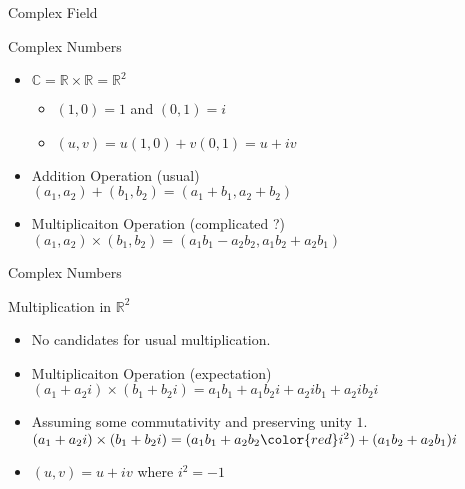 \documentclass{beamer}
\begin{document}
\begin{frame}{Complex Field}
\begin{block}{Complex Numbers}
\begin{itemize}
	\item $\mathbb{C} = \mathbb{R} \times \mathbb{R} = \mathbb{R}^2$
	\begin{itemize}
		\item $(1,0) = 1$ and $(0,1) = i$
		\item $(u,v) = u(1,0)+v(0,1) = u+iv$
	\end{itemize}
	\item Addition Operation (usual)\\
		$(a_1,a_2) + (b_1,b_2) = (a_1+b_1,a_2+b_2)$
	\item Multiplicaiton Operation (complicated ?)\\
		$(a_1,a_2) \times (b_1,b_2) = (a_1b_1-a_2b_2,a_1b_2+a_2b_1)$
\end{itemize}
\end{block}
\end{frame}
\begin{frame}{Complex Numbers}
\begin{block}{Multiplication in $\mathbb{R}^2$}
\begin{itemize}
	\item No candidates for usual multiplication.
	\item Multiplicaiton Operation (expectation)\\
		$(a_1+a_2i) \times (b_1+b_2i) = a_1b_1+a_1b_2i+a_2ib_1+a_2ib_2i$
	\item Assuming some commutativity and preserving unity $1$. \\
		$(a_1+a_2i) \times (b_1+b_2i) = (a_1b_1+a_2b_2{\color{red}i^2}) + (a_1b_2+a_2b_1)i$\\
	\item $(u,v) = u+iv$ where $i^2 = -1$
\end{itemize}
\end{block}
\end{frame}
\end{document}
